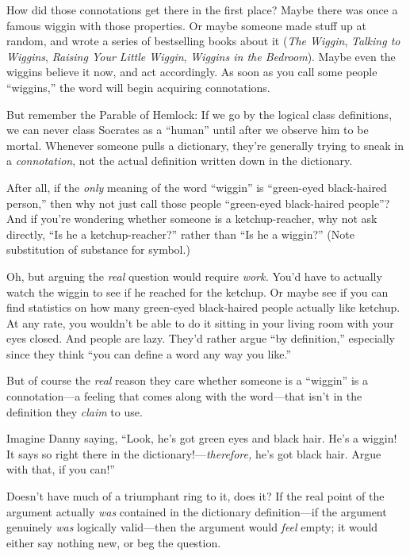 {
 How did those connotations get there in the first place? Maybe
there was once a famous wiggin with those properties. Or maybe someone
made stuff up at random, and wrote a series of bestselling books about
it (\textit{The Wiggin}, \textit{Talking to Wiggins}, \textit{Raising
Your Little Wiggin}, \textit{Wiggins in the Bedroom}). Maybe even the
wiggins believe it now, and act accordingly. As soon as you call some
people ``wiggins,'' the word will
begin acquiring connotations.}

{
 But remember the Parable of Hemlock: If we go by the logical class
definitions, we can never class Socrates as a
``human'' until after we observe him
to be mortal. Whenever someone pulls a dictionary,
they're generally trying to sneak in a
\textit{connotation}, not the actual definition written down in the
dictionary.}

{
 After all, if the \textit{only} meaning of the word
``wiggin'' is
``green-eyed black-haired person,''
then why not just call those people ``green-eyed
black-haired people''? And if you're
wondering whether someone is a ketchup-reacher, why not ask directly,
``Is he a ketchup-reacher?'' rather
than ``Is he a wiggin?'' (Note
substitution of substance for symbol.)}

{
 Oh, but arguing the \textit{real} question would require
\textit{work.} You'd have to actually watch the wiggin
to see if he reached for the ketchup. Or maybe see if you can find
statistics on how many green-eyed black-haired people actually like
ketchup. At any rate, you wouldn't be able to do it
sitting in your living room with your eyes closed. And people are lazy.
They'd rather argue ``by
definition,'' especially since they think
``you can define a word any way you
like.''}

{
 But of course the \textit{real} reason they care whether someone
is a ``wiggin'' is a connotation---a
feeling that comes along with the word---that isn't in
the definition they \textit{claim} to use.}

{
 Imagine Danny saying, ``Look,
he's got green eyes and black hair.
He's a wiggin! It says so right there in the
dictionary!---\textit{therefore,} he's got black hair.
Argue with that, if you can!''}

{
 Doesn't have much of a triumphant ring to it, does
it? If the real point of the argument actually \textit{was} contained
in the dictionary definition---if the argument genuinely \textit{was}
logically valid---then the argument would \textit{feel} empty; it would
either say nothing new, or beg the question.}

